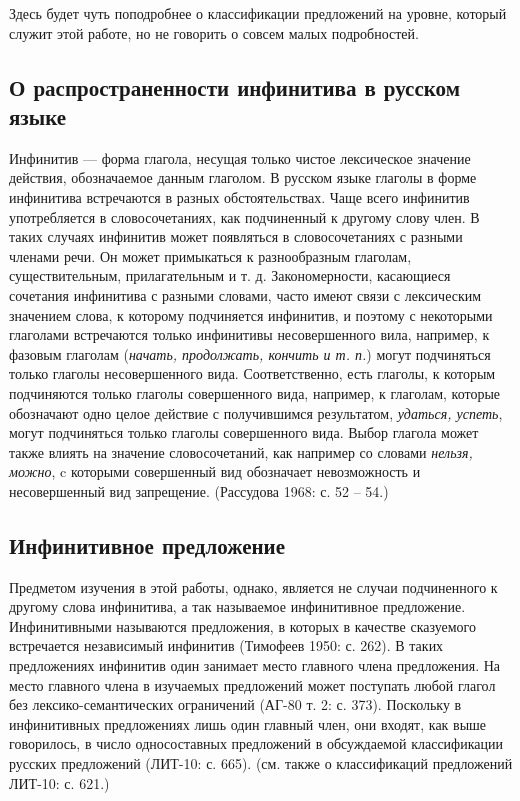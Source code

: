 Здесь будет чуть поподробнее о классификации предложений на уровне, который служит этой работе, но не говорить о совсем малых подробностей.

\subsection{О распространенности инфинитива в русском языке}

Инфинитив --- форма глагола, несущая только чистое лексическое значение действия, обозначаемое данным глаголом. В русском языке глаголы в форме инфинитива встречаются в разных обстоятельствах. Чаще всего инфинитив употребляется в словосочетаниях, как подчиненный к другому слову член. В таких случаях инфинитив может появляться в словосочетаниях с разными членами речи. Он может примыкаться к разнообразным глаголам, существительным, прилагательным и т. д. Закономерности, касающиеся сочетания инфинитива с разными словами, часто имеют связи с лексическим значением слова, к которому подчиняется инфинитив, и поэтому с некоторыми глаголами встречаются только инфинитивы несовершенного вила, например, к фазовым глаголам (\textit{начать, продолжать, кончить и т. п.}) могут подчиняться только глаголы несовершенного вида. Соответственно, есть глаголы, к которым подчиняются только глаголы совершенного вида, например, к глаголам, которые обозначают одно целое действие с получившимся результатом, \textit{удаться, успеть}, могут подчиняться только глаголы совершенного вида. Выбор глагола может также влиять на значение словосочетаний, как например со словами \textit{нельзя, можно}, c которыми совершенный вид обозначает невозможность и несовершенный вид запрещение. (Рассудова 1968: с. 52 -- 54.)

\subsection{Инфинитивное предложение}

Предметом изучения в этой работы, однако, является не случаи подчиненного к другому слова инфинитива, а так называемое инфинитивное предложение. Инфинитивными называются предложения, в которых в качестве сказуемого встречается независимый инфинитив (Тимофеев 1950: с. 262). В таких предложениях инфинитив один занимает место главного члена предложения. На место главного члена в изучаемых предложений может поступать любой глагол без лексико-семантических ограничений (АГ-80 т. 2: с. 373). Поскольку в инфинитивных предложениях лишь один главный член, они входят, как выше говорилось, в число односоставных предложений в обсуждаемой классификации русских предложений (ЛИТ-10: с. 665). (см. также о классификаций предложений ЛИТ-10: с. 621.)

